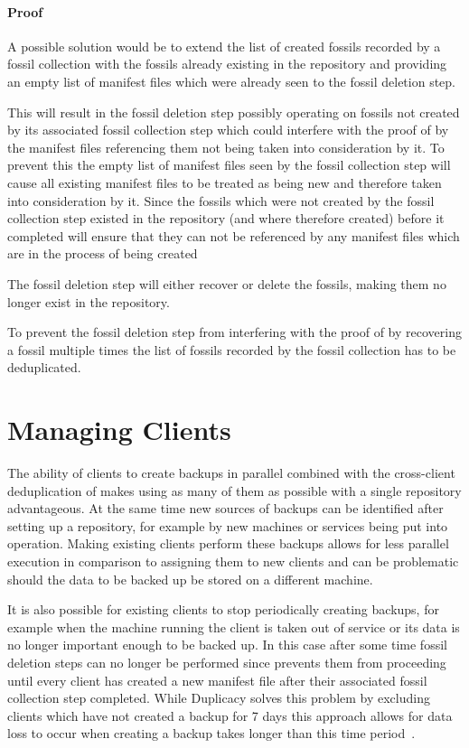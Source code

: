 \paragraph{Proof} A possible solution would be to extend the list of created
fossils recorded by a fossil collection with the fossils already existing in
the repository and providing an empty list of manifest files which were
already seen to the fossil deletion step.

This will result in the fossil deletion step possibly operating on fossils
not created by its associated fossil collection step which could interfere
with the proof of  by the manifest files referencing
them not being taken into consideration by it.
To prevent this the empty list of manifest files seen by the fossil collection
step will cause all existing manifest files to be treated as being new and
therefore taken into consideration by it.
Since the fossils which were not created by the fossil collection step existed
in the repository (and where therefore created) before it completed 
will ensure that they can not be referenced by any manifest files which are in the
process of being created

The fossil deletion step will either recover or delete the fossils, making them no
longer exist in the repository.

To prevent the fossil deletion step from interfering with the proof of 
 by recovering a fossil multiple times the list
of fossils recorded by the fossil collection has to be deduplicated.

\section{Managing Clients}

The ability of clients to create backups in parallel combined with the cross-client
deduplication of  makes using as many of them as possible
with a single repository advantageous.
At the same time new sources of backups can be identified after setting up a repository,
for example by new machines or services being put into operation.
Making existing clients perform these backups allows for less parallel execution
in comparison to assigning them to new clients and can be problematic should the
data to be backed up be stored on a different machine.

It is also possible for existing clients to stop periodically creating backups,
for example when the machine running the client is taken out of service or its
data is no longer important enough to be backed up.
In this case after some time fossil deletion steps can no longer be performed since
 prevents them from proceeding until every client has created
a new manifest file after their associated fossil collection step completed.
While Duplicacy solves this problem by excluding clients which have not created a backup
for 7 days this approach allows for data loss to occur when creating a backup takes
longer than this time period~\cite[topic `Prune command details']{Duplicacy-Forum}.

